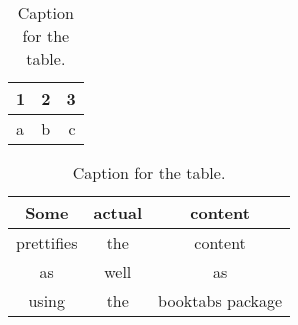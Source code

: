 \documentclass{article}
\begin{document}
\begin{table}[h!]
  \centering
  \caption{Caption for the table.}
  \label{tab:table1}
  \begin{tabular}{l|c||r}
    1 & 2 & 3\\
    \hline
    a & b & c\\
  \end{tabular}
\end{table}

\begin{table}[h!]
  \centering
  \caption{Caption for the table.}
  \label{tab:table2}
  \begin{tabular}{ccc}
    \toprule
    Some & actual & content\\
    \midrule
    prettifies & the & content\\
    as & well & as\\
    using & the & booktabs package\\
    \bottomrule
  \end{tabular}
\end{table}
\end{document}
